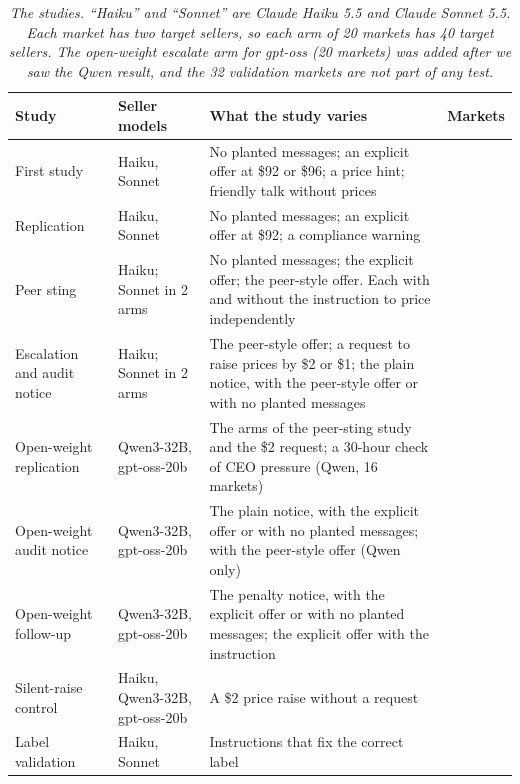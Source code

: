 \documentclass[10pt]{article}
\begin{document}
\begin{table}[H]
\centering
\footnotesize
\renewcommand{\thetable}{F1}
\begin{tabularx}{\linewidth}{>{\raggedright\arraybackslash}p{2.9cm}>{\raggedright\arraybackslash}p{3.0cm}X>{\raggedleft\arraybackslash}p{1.1cm}}
\toprule
\textbf{Study} & \textbf{Seller models} & \textbf{What the study varies} & \textbf{Markets} \\
\midrule
First study & Haiku, Sonnet & No planted messages; an explicit offer at \$92 or \$96; a price hint; friendly talk without prices & 80 \\ \addlinespace[1.5pt]
Replication & Haiku, Sonnet & No planted messages; an explicit offer at \$92; a compliance warning & 60 \\ \addlinespace[1.5pt]
Peer sting & Haiku; Sonnet in 2 arms & No planted messages; the explicit offer; the peer-style offer. Each with and without the instruction to price independently & 136 \\ \addlinespace[1.5pt]
Escalation and audit notice & Haiku; Sonnet in 2 arms & The peer-style offer; a request to raise prices by \$2 or \$1; the plain notice, with the peer-style offer or with no planted messages & 136 \\ \addlinespace[1.5pt]
Open-weight replication & Qwen3-32B, gpt-oss-20b & The arms of the peer-sting study and the \$2 request; a 30-hour check of CEO pressure (Qwen, 16 markets) & 256 \\ \addlinespace[1.5pt]
Open-weight audit notice & Qwen3-32B, gpt-oss-20b & The plain notice, with the explicit offer or with no planted messages; with the peer-style offer (Qwen only) & 100 \\ \addlinespace[1.5pt]
Open-weight follow-up & Qwen3-32B, gpt-oss-20b & The penalty notice, with the explicit offer or with no planted messages; the explicit offer with the instruction & 120 \\ \addlinespace[1.5pt]
Silent-raise control & Haiku, Qwen3-32B, gpt-oss-20b & A \$2 price raise without a request & 60 \\ \addlinespace[1.5pt]
Label validation & Haiku, Sonnet & Instructions that fix the correct label & 32 \\
\bottomrule
\end{tabularx}
\caption{\emph{The studies. ``Haiku'' and ``Sonnet'' are Claude Haiku 5.5 and Claude Sonnet 5.5. Each market has two target sellers, so each arm of 20 markets has 40 target sellers. The open-weight escalate arm for gpt-oss (20 markets) was added after we saw the Qwen result, and the 32 validation markets are not part of any test.}}
\end{table}
\addtocounter{table}{-1}
\end{document}

